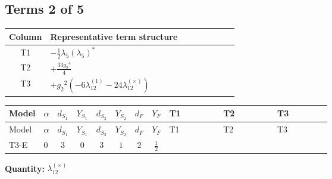 \documentclass[8pt]{article}
\begin{document}
\begin{landscape}
\subsection*{Terms 2 of 5}
\begin{center}
\begin{tabular}{@{}c >{\raggedright\arraybackslash}p{0.82\linewidth}@{}}
\toprule
Column & Representative term structure \\
\midrule
T1 & \(\displaystyle -\frac{1}{2} {\lambda_5} \left({\lambda_5}\right)^{*}\) \\
\midrule
T2 & \(\displaystyle +\frac{33 {g_2}^4}{4}\) \\
\midrule
T3 & \(\displaystyle +{g_2}^2 (-6 {\lambda_{12}^{(1)}}-24 {\lambda_{12}^{(\times)}})\) \\
\midrule
\bottomrule
\end{tabular}
\end{center}
\smallskip
\tiny
\begin{longtable}{@{}llcccccc >{\raggedright\arraybackslash}p{0.21\linewidth} >{\raggedright\arraybackslash}p{0.21\linewidth} >{\raggedright\arraybackslash}p{0.21\linewidth}@{}}
\toprule
Model & $\alpha$ & $d_{S_1}$ & $Y_{S_1}$ & $d_{S_2}$ & $Y_{S_2}$ & $d_F$ & $Y_F$ & T1 & T2 & T3 \\
\midrule
\endfirsthead
\toprule
Model & $\alpha$ & $d_{S_1}$ & $Y_{S_1}$ & $d_{S_2}$ & $Y_{S_2}$ & $d_F$ & $Y_F$ & T1 & T2 & T3 \\
\midrule
\endhead
T3-E & $0$ & $3$ & $0$ & $3$ & $1$ & $2$ & $\frac{1}{2}$ & \scriptsize\adjustbox{max width=\linewidth}{$\begin{gathered} -\frac{1}{2} {\lambda_5} \left({\lambda_5}\right)^{*}\end{gathered}$} & \scriptsize\adjustbox{max width=\linewidth}{$\begin{gathered} +\frac{33 {g_2}^4}{4}\end{gathered}$} & \scriptsize\adjustbox{max width=\linewidth}{$\begin{gathered} +{g_2}^2 (-6 {\lambda_{12}^{(1)}}-24 {\lambda_{12}^{(\times)}})\end{gathered}$} \\
\midrule
\bottomrule
\end{longtable}
\clearpage
\noindent\textbf{Quantity: }$\lambda_{12}^{(\times)}$\par\smallskip

\end{landscape}
\end{document}
